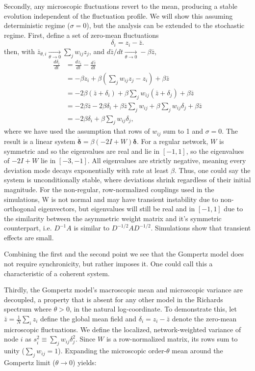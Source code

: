 \documentclass{article}
\begin{document}
Secondly, any microscopic fluctuations revert to the mean, producing a stable evolution independent of the fluctuation profile. We will show this assuming deterministic regime ($\sigma=0$), but the analysis can be extended to the stochastic regime. First, define a set of zero-mean fluctuations 
\begin{equation}
  \delta_i = z_i - \bar{z}.
\end{equation}
then, with $\bar{z}_{\theta,i}\xrightarrow[\theta \to 0]{} \sum_j w_{ij}z_j$, and $d\bar{z}/dt\xrightarrow[\theta \to 0]{} -\beta\bar{z}$,
\begin{align}
\frac{d\delta_i}{dt} &= \frac{dz_i}{dt} - \frac{d\bar{z}}{dt} \\
&= -\beta z_i + \beta\left(\sum_j w_{ij}z_j - z_i\right) + \beta\bar{z} \\
&= -2\beta(\bar{z} + \delta_i) + \beta\sum_j w_{ij}(\bar{z} + \delta_j) + \beta\bar{z} \\
&= -2\beta\bar{z} - 2\beta\delta_i + \beta\bar{z}\sum_j w_{ij} + \beta\sum_j w_{ij}\delta_j + \beta\bar{z} \\
&= -2\beta\delta_i + \beta\sum_j w_{ij}\delta_j,
\end{align}
where we have used the assumption that rows of $w_{ij}$ sum to 1 and $\sigma=0$. 
The result is a linear system $\dot{\boldsymbol{\delta}} = \beta(-2I + W)\boldsymbol{\delta}$. For a regular network, $W$ is symmetric and so the eigenvalues are real and lie in $[-1, 1]$, so the eigenvalues of $-2I + W$ lie in $[-3, -1]$. All eigenvalues are strictly negative, meaning every deviation mode decays exponentially with rate at least $\beta$. Thus, one could say the system is unconditionally stable, where deviations shrink regardless of their initial magnitude. For the non-regular, row-normalized couplings used in the simulations, W is not normal and may have transient instability due to non-orthogonal eigenvectors, but eigenvalues will still be real and in $[-1,1]$ due to the similarity between the asymmetric weight matrix and it's symmetric counterpart, i.e. $D^{-1}A$ is similar to $D^{-1/2}AD^{-1/2}$. Simulations show that transient effects are small.

Combining the first and the second point we see that the Gompertz model does not require synchronicity, but rather imposes it. One could call this a characteristic of a coherent system. 

Thirdly, the Gompertz model's macroscopic mean and microscopic variance are decoupled, a property that is absent for any other model in the Richards spectrum where $\theta > 0$, in the natural log-coordinate. To demonstrate this, let $\bar{z} = \frac{1}{N}\sum_i z_i$ define the global mean field and $\delta_i = z_i - \bar{z}$ denote the zero-mean microscopic fluctuations. We define the localized, network-weighted variance of node $i$ as $s_i^2 \equiv \sum_j w_{ij}\delta_j^2$. Since $W$ is a row-normalized matrix, its rows sum to unity ($\sum_j w_{ij} = 1$). Expanding the microscopic order-$\theta$ mean around the Gompertz limit ($\theta \to 0$) yields:
\end{document}
